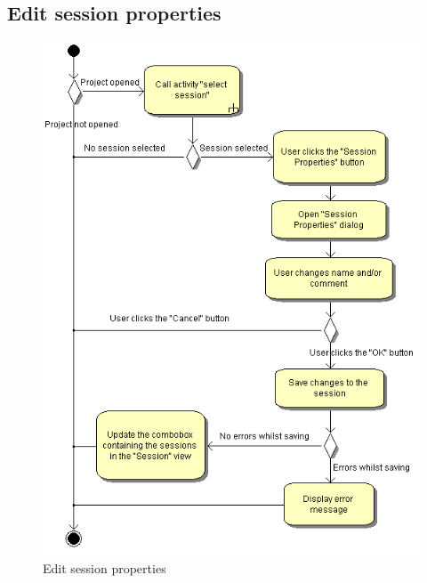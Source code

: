 \subsection{Edit session properties}
\begin{figure}[htb]
 \centering
 \includegraphics[height=0.7\textheight]{images/Activities/edit_session_properites.png}
 \caption{Edit session properties}
 \label{ac_fg:edit_session}
\end{figure}

\clearpage
